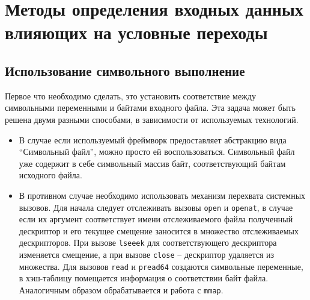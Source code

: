 \chapter{Методы определения входных данных влияющих на условные переходы}









\section{Использование символьного выполнение}

Первое что необходимо сделать, это установить соответствие между символьными переменными и байтами входного файла. Эта задача может быть решена двумя разными способами, в зависимости от используемых технологий.

\begin{itemize}
    \item В случае если используемый фреймворк предоставляет абстракцию вида ``Символьный файл'', можно просто ей воспользоваться. Символьный файл уже содержит в себе символьный массив байт, соответствующий байтам исходного файла.
    \item В противном случае необходимо использовать механизм перехвата системных вызовов. Для начала следует отслеживать вызовы \texttt{open} и \texttt{openat}, в случае если их аргумент соответствует имени отслеживаемого файла полученный дескриптор и его текущее смещение заносится в множество отслеживаемых дескрипторов. При вызове \texttt{lseeek} для соответствующего дескриптора изменяется смещение, а при вызове \texttt{close} -- дескриптор удаляется из множества. Для вызовов \texttt{read} и \texttt{pread64} создаются символьные переменные, в хэш-таблицу помещается информация о соответствии байт файла. Аналогичным образом обрабатывается и работа с \texttt{mmap}.
\end{itemize}


